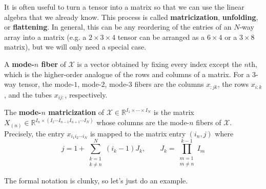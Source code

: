   It is often useful to turn a tensor into a matrix so that we can use the linear algebra that we already know. This process is called \textbf{matricization}, \textbf{unfolding}, or \textbf{flattening}. In general, this can be any reordering of the entries of an $N$-way array into a matrix (e.g. a $2 \times 3 \times 4$ tensor can be arranged as a $6 \times 4$ or a $3 \times 8$ matrix), but we will only need a special case.

  A \textbf{mode-$n$ fiber} of $\mathcal{X}$ is a vector obtained by fixing every index except the $n$th, which is the higher-order analogue of the rows and columns of a matrix. For a $3$-way tensor, the mode-$1$, mode-$2$, mode-$3$ fibers are the columns $x_{:jk}$, the rows $x_{i:k}$, and the tubes $x_{ij:}$, respectively.

  \begin{definition}
    \label{def:mode-n-matricization}
    The \textbf{mode-$n$ matricization} of $\mathcal{X} \in \mathbb{R}^{I_1 \times \cdots \times I_N}$ is the matrix $X_{(n)} \in \mathbb{R}^{I_n \times (I_1 \cdots I_{n-1} I_{n+1} \cdots I_N)}$ whose columns are the mode-$n$ fibers of $\mathcal{X}$. Precisely, the entry $x_{i_1 i_2 \cdots i_N}$ is mapped to the matrix entry $(i_n, j)$ where
    \begin{equation}
      j = 1 + \sum_{\substack{k=1 \\ k \neq n}}^N (i_k - 1) J_k, \qquad J_k = \prod_{\substack{m=1 \\ m \neq n}}^{k-1} I_m
    \end{equation}
  \end{definition}

  The formal notation is clunky, so let's just do an example.

